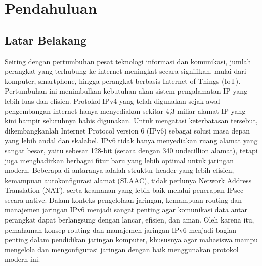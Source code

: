 \section{Pendahuluan}
\subsection{Latar Belakang}
Seiring dengan pertumbuhan pesat teknologi informasi dan komunikasi, jumlah perangkat yang terhubung ke internet meningkat secara signifikan, mulai dari komputer, smartphone, hingga perangkat berbasis Internet of Things (IoT). Pertumbuhan ini menimbulkan kebutuhan akan sistem pengalamatan IP yang lebih luas dan efisien. Protokol IPv4 yang telah digunakan sejak awal pengembangan internet hanya menyediakan sekitar 4,3 miliar alamat IP yang kini hampir seluruhnya habis digunakan. Untuk mengatasi keterbatasan tersebut, dikembangkanlah Internet Protocol version 6 (IPv6) sebagai solusi masa depan yang lebih andal dan skalabel. IPv6 tidak hanya menyediakan ruang alamat yang sangat besar, yaitu sebesar 128-bit (setara dengan 340 undecillion alamat), tetapi juga menghadirkan berbagai fitur baru yang lebih optimal untuk jaringan modern. Beberapa di antaranya adalah struktur header yang lebih efisien, kemampuan autokonfigurasi alamat (SLAAC), tidak perlunya Network Address Translation (NAT), serta keamanan yang lebih baik melalui penerapan IPsec secara native. Dalam konteks pengelolaan jaringan, kemampuan routing dan manajemen jaringan IPv6 menjadi sangat penting agar komunikasi data antar perangkat dapat berlangsung dengan lancar, efisien, dan aman. Oleh karena itu, pemahaman konsep routing dan manajemen jaringan IPv6 menjadi bagian penting dalam pendidikan jaringan komputer, khususnya agar mahasiswa mampu mengelola dan mengonfigurasi jaringan dengan baik menggunakan protokol modern ini.


